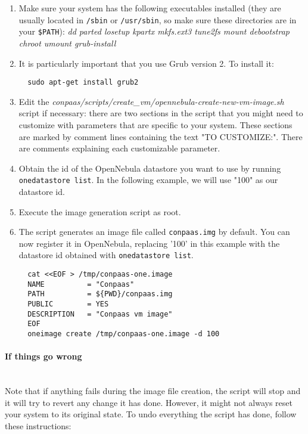 \documentclass[10pt]{article}
\begin{document}
\begin{enumerate}
\item Make sure your system has the following executables installed
  (they are usually located in \verb+/sbin+ or \verb+/usr/sbin+, so
  make sure these directories are in your \verb+$PATH+): %
  \emph{dd parted losetup kpartx mkfs.ext3 tune2fs mount debootstrap
    chroot umount grub-install}
\item It is particularly important that you use Grub version 2. To
  install it:
  \begin{verbatim}
  sudo apt-get install grub2
  \end{verbatim}
\item Edit the
  \textit{conpaas/scripts/create\_vm/opennebula-create-new-vm-image.sh} script
  if necessary: there are two sections in the script that you might need
  to customize with parameters that are specific to your system. These
  sections are marked by comment lines containing the text "TO CUSTOMIZE:".
  There are comments explaining each customizable parameter. 
\item Obtain the id of the OpenNebula datastore you want to use by running
  \verb+onedatastore list+. In the following example, we will use "100" as our datastore id.
\item Execute the image generation script as root.
\item The script generates an image file called \verb+conpaas.img+ by default.
You can now register it in OpenNebula, replacing '100' in this example with the
datastore id obtained with \verb+onedatastore list+.

\vspace{10 mm}

\begin{verbatim}
  cat <<EOF > /tmp/conpaas-one.image
  NAME          = "Conpaas"
  PATH          = ${PWD}/conpaas.img
  PUBLIC        = YES
  DESCRIPTION   = "Conpaas vm image"
  EOF
  oneimage create /tmp/conpaas-one.image -d 100
\end{verbatim}
\end{enumerate}

\paragraph{If things go wrong}~\\

Note that if anything fails during the image file creation, the script will
stop and it will try to revert any change it has done. However, it might not
always reset your system to its original state. To undo everything the script
has done, follow these instructions:
\end{document}
